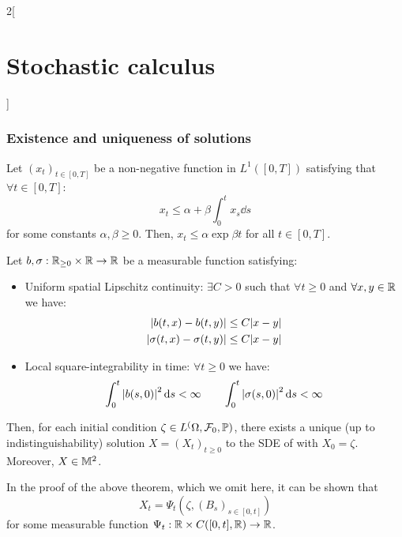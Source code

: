 \documentclass[../../../main_math.tex]{subfiles}
\begin{document}
\begin{multicols}{2}[\section{Stochastic calculus}]
  \subsubsection{Existence and uniqueness of solutions}
  \begin{lemma}
    Let ${(x_t)}_{t\in[0,T]}$ be a non-negative function in $L^1([0,T])$ satisfying that $\forall t\in[0,T]$:
    $$
      x_t\leq \alpha+\beta\int_0^t x_s\dd{s}
    $$
    for some constants $\alpha,\beta\geq 0$. Then, $x_t\leq \alpha\exp{\beta t}$ for all $t\in[0,T]$.
  \end{lemma}
  \begin{theorem}\label{SC:existence_uniqueness_SDE}
    Let $b,\sigma:\mathbb{R}_{\geq 0}\times\mathbb{R}\to \mathbb{R}$ be a measurable function satisfying:
    \begin{itemize}
      \item Uniform spatial Lipschitz continuity: $\exists C>0$ such that $\forall t\geq 0$ and $\forall x,y\in\mathbb{R}$ we have:
            \begin{align*}
              \abs{b(t,x)-b(t,y)}           & \leq C\abs{x-y} \\
              \abs{\sigma(t,x)-\sigma(t,y)} & \leq C\abs{x-y}
            \end{align*}
      \item Local square-integrability in time: $\forall t \geq 0$ we have: $$\int_0^t \abs{b(s,0)}^2\dd{s}<\infty
              \qquad \int_0^t \abs{\sigma(s,0)}^2\dd{s}<\infty
            $$
    \end{itemize}
    Then, for each initial condition $\zeta\in L^(\Omega,\mathcal{F}_0,\mathbb{P})$, there exists a unique (up to indistinguishability) solution $X={(X_t)}_{t\geq 0}$ to the SDE of  with $X_0=\zeta$. Moreover, $X\in \mathbb{M}^2$.
  \end{theorem}
  \begin{remark}
    In the proof of the above theorem, which we omit here, it can be shown that
    \begin{equation}\label{SC:expression_x_psi}
      X_t=\Psi_t\left(\zeta,{(B_s)}_{s\in[0,t]}\right)
    \end{equation}
    for some measurable function $\Psi_t:\mathbb{R}\times C([0,t],\mathbb{R})\to \mathbb{R}$.
  \end{remark}

\end{multicols}
\end{document}
